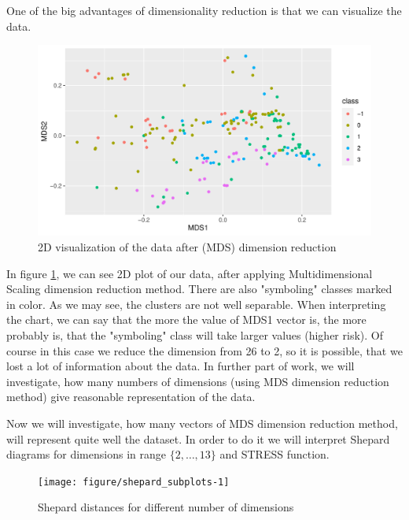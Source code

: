\documentclass[11pt,a4paper]{article}\usepackage[]{graphicx}\usepackage[]{xcolor}
\makeatletter
\def\maxwidth{ %
  \ifdim\Gin@nat@width>\linewidth
    \linewidth
  \else
    \Gin@nat@width
  \fi
}
\newenvironment{knitrout}{}{} %
\makeatother
\begin{document}
	
	One of the big advantages of dimensionality reduction is that we can visualize the data.
	
\begin{knitrout}
\color{fgcolor}\begin{figure}
\includegraphics[width=\maxwidth]{figure/mds_2d-1} \caption[2D visualization of the data after (MDS) dimension reduction]{2D visualization of the data after (MDS) dimension reduction}\label{fig:mds_2d}
\end{figure}

\end{knitrout}
	
	In figure \ref{fig:mds_2d}, we can see 2D plot of our data, after applying Multidimensional Scaling dimension reduction method. There are also "symboling" classes marked in color. As we may see, the clusters are not well separable. When interpreting the chart, we can say that the more the value of MDS1 vector is, the more probably is, that the "symboling" class will take larger values (higher risk). Of course in this case we reduce the dimension from 26 to 2, so it is possible, that we lost a lot of information about the data. In further part of work, we will investigate, how many numbers of dimensions (using MDS dimension reduction method) give reasonable representation of the data.
	
	 Now we will investigate, how many vectors of MDS dimension reduction method, will represent quite well the dataset. In order to do it we will interpret Shepard diagrams for dimensions in range $\{2, \dots, 13\}$ and STRESS function.
	 

	 
\begin{knitrout}
\color{fgcolor}\begin{figure}
\texttt{[image: figure/shepard\_subplots-1]} \caption[Shepard distances for different number of dimensions]{Shepard distances for different number of dimensions}\label{fig:shepard_subplots}
\end{figure}

\end{knitrout}
	 
\end{document}
